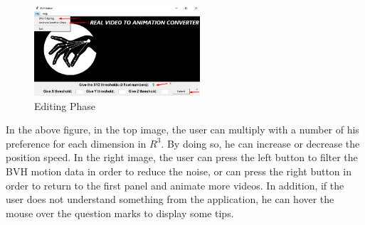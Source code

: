  \begin{figure}[h]
	\centering
	\includegraphics[width=0.55\textwidth]{figures/Requirements/Workflow2_1.png}
	\captionsetup{labelformat=empty}
	\caption{Editing Phase}
\end{figure}

\pagebreak

In the above figure, in the top image, the user can multiply with a number of his preference for each dimension in $R^3$. By doing so, he can increase or decrease the position speed. In the right image, the user can press the left button to filter the BVH motion data in order to reduce the noise, or can press the right button in order to return to the first panel and animate more videos. In addition, if the user does not understand something from the application, he can hover the mouse over the question marks to display some tips.\\\\



